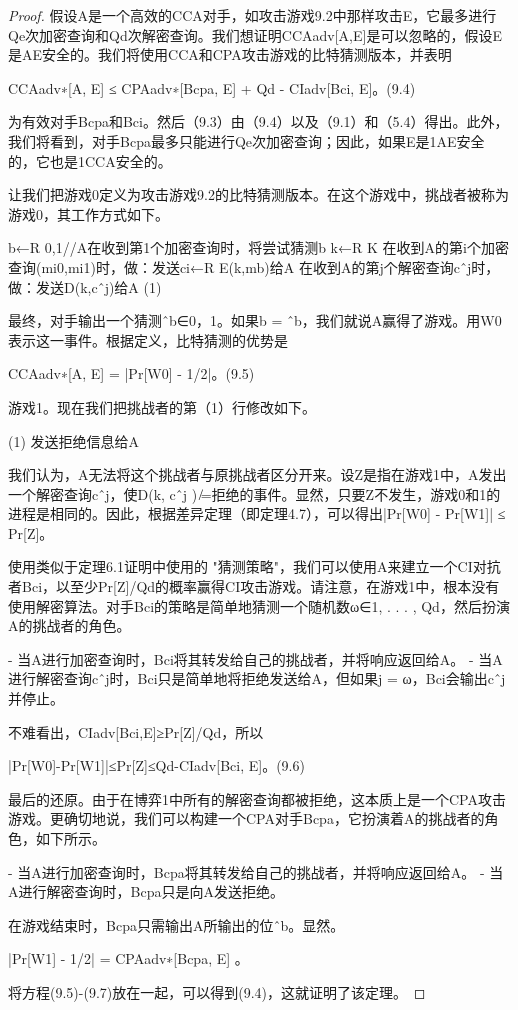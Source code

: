 \begin{proof}
假设A是一个高效的CCA对手，如攻击游戏9.2中那样攻击E，它最多进行Qe次加密查询和Qd次解密查询。我们想证明CCAadv[A,E]是可以忽略的，假设E是AE安全的。我们将使用CCA和CPA攻击游戏的比特猜测版本，并表明

CCAadv∗[A, E] ≤ CPAadv∗[Bcpa, E] + Qd - CIadv[Bci, E]。(9.4)

为有效对手Bcpa和Bci。然后（9.3）由（9.4）以及（9.1）和（5.4）得出。此外，我们将看到，对手Bcpa最多只能进行Qe次加密查询；因此，如果E是1AE安全的，它也是1CCA安全的。

让我们把游戏0定义为攻击游戏9.2的比特猜测版本。在这个游戏中，挑战者被称为游戏0，其工作方式如下。

b←R {0,1}//A在收到第1个加密查询时，将尝试猜测b k←R K
在收到A的第i个加密查询(mi0,mi1)时，做：发送ci←R E(k,mb)给A
在收到A的第j个解密查询cˆj时，做：发送D(k,cˆj)给A
(1)

最终，对手输出一个猜测ˆb∈{0，1}。如果b = ˆb，我们就说A赢得了游戏。用W0表示这一事件。根据定义，比特猜测的优势是

CCAadv∗[A, E] = |Pr[W0] - 1/2|。(9.5)

游戏1。现在我们把挑战者的第（1）行修改如下。

(1) 发送拒绝信息给A

我们认为，A无法将这个挑战者与原挑战者区分开来。设Z是指在游戏1中，A发出一个解密查询cˆj，使D(k, cˆj ) ̸=拒绝的事件。显然，只要Z不发生，游戏0和1的进程是相同的。因此，根据差异定理（即定理4.7），可以得出|Pr[W0] - Pr[W1]| ≤ Pr[Z]。

使用类似于定理6.1证明中使用的 "猜测策略"，我们可以使用A来建立一个CI对抗者Bci，以至少Pr[Z]/Qd的概率赢得CI攻击游戏。请注意，在游戏1中，根本没有使用解密算法。对手Bci的策略是简单地猜测一个随机数ω∈{1, . . . , Qd}，然后扮演A的挑战者的角色。

- 当A进行加密查询时，Bci将其转发给自己的挑战者，并将响应返回给A。
- 当A进行解密查询cˆj时，Bci只是简单地将拒绝发送给A，但如果j = ω，Bci会输出cˆj并停止。

不难看出，CIadv[Bci,E]≥Pr[Z]/Qd，所以

|Pr[W0]-Pr[W1]|≤Pr[Z]≤Qd-CIadv[Bci, E]。(9.6)

最后的还原。由于在博弈1中所有的解密查询都被拒绝，这本质上是一个CPA攻击游戏。更确切地说，我们可以构建一个CPA对手Bcpa，它扮演着A的挑战者的角色，如下所示。

- 当A进行加密查询时，Bcpa将其转发给自己的挑战者，并将响应返回给A。
- 当A进行解密查询时，Bcpa只是向A发送拒绝。

在游戏结束时，Bcpa只需输出A所输出的位ˆb。显然。

|Pr[W1] - 1/2| = CPAadv∗[Bcpa, E] 。

将方程(9.5)-(9.7)放在一起，可以得到(9.4)，这就证明了该定理。
\end{proof}